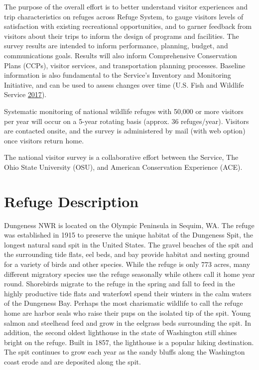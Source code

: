 \documentclass[]{book}
\begin{document}
The purpose of the overall effort is to better understand visitor
experiences and trip characteristics on refuges across Refuge System, to
gauge visitors levels of satisfaction with existing recreational
opportunities, and to garner feedback from visitors about their trips to
inform the design of programs and facilities. The survey results are
intended to inform performance, planning, budget, and communications
goals. Results will also inform Comprehensive Conservation Plans (CCPs),
visitor services, and transportation planning processes. Baseline
information is also fundamental to the Service's Inventory and
Monitoring Initiative, and can be used to assess changes over time (U.S.
Fish and Wildlife Service \protect\hyperlink{ref-USFWS2017}{2017}).

Systematic monitoring of national wildlife refuges with 50,000 or more
visitors per year will occur on a 5-year rotating basis (approx. 36
refuges/year). Visitors are contacted onsite, and the survey is
administered by mail (with web option) once visitors return home.

The national visitor survey is a collaborative effort between the
Service, The Ohio State University (OSU), and American Conservation
Experience (ACE).

\chapter{Refuge Description}\label{refuge-description}

Dungeness NWR is located on the Olympic Peninsula in Sequim, WA. The
refuge was established in 1915 to preserve the unique habitat of the
Dungeness Spit, the longest natural sand spit in the United States. The
gravel beaches of the spit and the surrounding tide flats, eel beds, and
bay provide habitat and nesting ground for a variety of birds and other
species. While the refuge is only 773 acres, many different migratory
species use the refuge seasonally while others call it home year round.
Shorebirds migrate to the refuge in the spring and fall to feed in the
highly productive tide flats and waterfowl spend their winters in the
calm waters of the Dungeness Bay. Perhaps the most charismatic wildlife
to call the refuge home are harbor seals who raise their pups on the
isolated tip of the spit. Young salmon and steelhead feed and grow in
the eelgrass beds surrounding the spit. In addition, the second oldest
lighthouse in the state of Washington still shines bright on the refuge.
Built in 1857, the lighthouse is a popular hiking destination. The spit
continues to grow each year as the sandy bluffs along the Washington
coast erode and are deposited along the spit.
\end{document}
